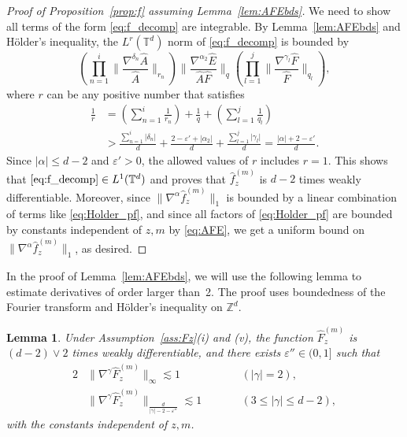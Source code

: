 \documentclass[11pt,hidelinks]{article}
\theoremstyle{plain}
\newtheorem{lemma}[theorem]{Lemma}
\numberwithin{equation}{section}
\newcommand{\eps}{\varepsilon}
\newcommand{\Z}{\mathbb{Z}}
\newcommand{\T}{\mathbb{T}}
\newcommand{\grad}{\nabla}
\renewcommand{\(}{\left(}
\renewcommand{\)}{\right)}
\newcommand{\1}{\mathds{1}}
\newcommand{\nl}{\nonumber \\}
\providecommand{\abs}[1]{\lvert#1\rvert}
\providecommand{\norm}[1]{\lVert#1\rVert}
\providecommand{\bignorm}[1]{\big\lVert#1\big\rVert}
\providecommand{\biggnorm}[1]{\bigg\lVert#1\bigg\rVert}
\newcommand{\supm}{^{(m)}}
\begin{document}
\begin{proof}[Proof of Proposition~\ref{prop:f} assuming Lemma~\ref{lem:AFEbds}]
We need to show all terms of the form \eqref{eq:f_decomp} are integrable.
By Lemma~\ref{lem:AFEbds} and 
H\"older's inequality, the $L^r(\T^d)$ norm of \eqref{eq:f_decomp} is bounded by
\begin{equation} \label{eq:Holder_pf}
\( \prod_{n=1}^i \biggnorm{ \frac{ \grad^{\delta_n} \hat A }{\hat A }}_{r_n} \)
\biggnorm{ \frac{ \grad^{\alpha_2} \hat E }{ \hat A \hat F } }_q
\( \prod_{l=1}^j \biggnorm{ \frac{ \grad^{\gamma_l} \hat F  }{ \hat F }}_{q_l} \),
\end{equation}
where $r$ can be any positive number that satisfies
\begin{align}
\frac 1 r &= \( \sum_{n=1}^i \frac 1 {r_n} \) + \frac 1 q + \( \sum_{l=1}^j \frac 1 {q_l} \) \nl
&> \frac{ \sum_{n=1}^i \abs{\delta_n}  } d  + \frac{ 2 - \eps' + \abs{\alpha_2}   } d + \frac{ \sum_{l=1}^j \abs{\gamma_l}  } d
= \frac{  \abs \alpha  + 2 - \eps' } d.
\end{align}
Since $\abs \alpha \le d-2$ and $\eps' > 0$,
the allowed values of $r$ includes $r = 1$.
This shows that $\eqref{eq:f_decomp}\in L^1(\T^d)$ and proves that $\hat f_z\supm$ is $d-2$ times weakly differentiable. 
Moreover, 
since $\norm{ \grad^\alpha \hat f_z\supm}_1$ is bounded by a linear combination of terms like \eqref{eq:Holder_pf}, and since all factors of \eqref{eq:Holder_pf} are bounded by constants independent of $z,m$ by \eqref{eq:AFE}, we get a uniform bound on $\norm{\grad^\alpha  \hat f_z\supm}_1$, as desired.
\end{proof}



In the proof of Lemma~\ref{lem:AFEbds}, we will use the following lemma to estimate derivatives of order larger than~2. The proof uses boundedness of the Fourier transform and H\"older's inequality on $\Z^d$. 

\begin{lemma}\label{lem:F}
Under Assumption~\ref{ass:Fz}(i) and (v), the function $\hat F_z\supm$ is $(d-2)\vee 2$ times weakly differentiable, and there exists $\eps'' \in (0,1]$ such that
\begin{alignat}{2} \label{eq:F_gamma_2}
&\bignorm{ \grad^\gamma \hat F_z\supm }_{ \infty } 
	\lesssim 1  	\qquad &&( \abs \gamma = 2 ), \\
&\bignorm{ \grad^\gamma \hat F_z\supm }_{ \frac d {\abs \gamma - 2 - \eps''} }
	\lesssim 1 	\qquad &&(3 \le \abs \gamma \le d-2 ), 
	\label{eq:F_gamma_3}
\end{alignat}
with the constants independent of $z, m$. 
\end{lemma}
\end{document}
